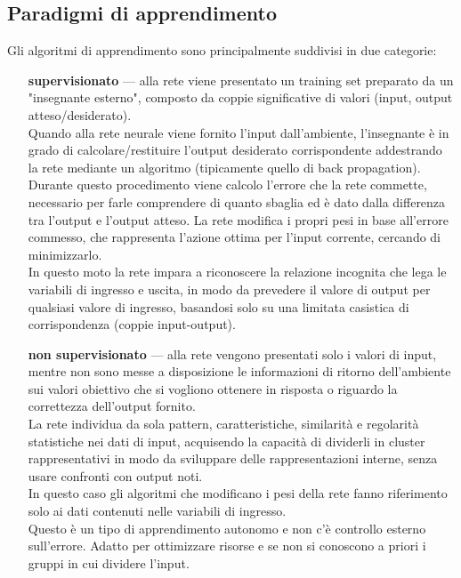 \subsection{Paradigmi di apprendimento}
\label{subsec:Paradigmi di apprendimento}

Gli algoritmi di apprendimento sono principalmente suddivisi in due categorie:
\begin{itemize}
	\item[\bfseries supervisionato] --- alla rete viene presentato un training set preparato da un "insegnante esterno", composto da coppie significative di valori (input, output atteso/desiderato).\\
	Quando alla rete neurale viene fornito l'input dall'ambiente, l'insegnante è in grado di calcolare/restituire l'output desiderato corrispondente addestrando la rete mediante un algoritmo (tipicamente quello di back propagation). 
	Durante questo procedimento viene calcolo l'errore che la rete commette, necessario per farle comprendere di quanto sbaglia ed è dato dalla differenza tra l'output e l'output atteso. La rete modifica i propri pesi in base all'errore commesso, che rappresenta l'azione ottima per l'input corrente, cercando di minimizzarlo.\\
	In questo moto la rete impara a riconoscere la relazione incognita che lega le variabili di ingresso e uscita, in modo da prevedere il valore di output per qualsiasi valore di ingresso, basandosi solo su una limitata casistica di corrispondenza (coppie input-output).
	
	\item[\bfseries non supervisionato] --- alla rete vengono presentati solo i valori di input, mentre non sono messe a disposizione le informazioni di ritorno dell'ambiente sui valori obiettivo che si vogliono ottenere in risposta o riguardo la correttezza dell'output fornito. \\
	La rete individua da sola pattern, caratteristiche, similarità e regolarità statistiche nei dati di input, acquisendo la capacità di dividerli in cluster rappresentativi in modo da sviluppare delle rappresentazioni interne, senza usare confronti con output noti.\\ 
	In questo caso gli algoritmi che modificano i pesi della rete fanno riferimento solo ai dati contenuti nelle variabili di ingresso.\\
	Questo è un tipo di apprendimento autonomo e non c'è controllo esterno sull'errore. Adatto per ottimizzare risorse e se non si conoscono a priori i gruppi in cui dividere l'input.
\end{itemize}


